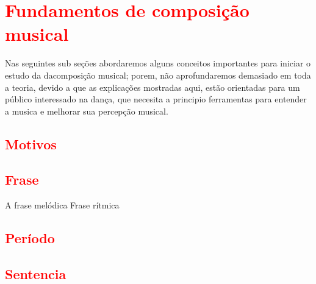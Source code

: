 
\chapter{\textcolor{red}{Fundamentos de composição musical}}
Nas seguintes sub seções abordaremos alguns conceitos importantes para iniciar o estudo da dacomposição musical;
porem, não aprofundaremos demasiado em toda a teoria, 
devido a que as explicações mostradas aqui, estão
orientadas para um público interessado na dança, que necesita a principio
ferramentas para entender a musica e melhorar sua percepção musical. 


 


\section{\textcolor{red}{Motivos}}

\section{\textcolor{red}{Frase}}
\cite[pp. 150]{medteoria}


A frase melódica
Frase rítmica
\section{\textcolor{red}{Período}}
\section{\textcolor{red}{Sentencia}}
